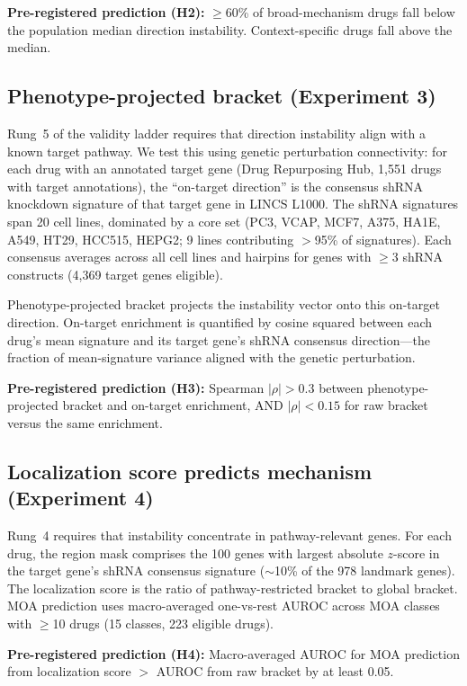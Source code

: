 \documentclass{article}
\begin{document}
\textbf{Pre-registered prediction (H2):} $\geq$60\% of broad-mechanism drugs
fall below the population median direction instability. Context-specific
drugs fall above the median.

\subsection{Phenotype-projected bracket (Experiment 3)}

Rung~5 of the validity ladder requires that direction instability align with
a known target pathway. We test this using genetic perturbation connectivity:
for each drug with an annotated target gene (Drug Repurposing Hub,
1{,}551 drugs with target annotations), the ``on-target direction'' is the
consensus shRNA knockdown signature of that target gene in LINCS L1000.
The shRNA signatures span 20 cell lines, dominated by a core set
(PC3, VCAP, MCF7, A375, HA1E, A549, HT29, HCC515, HEPG2; 9 lines
contributing $>$95\% of signatures). Each consensus averages across all
cell lines and hairpins for genes with $\geq$3 shRNA constructs
(4{,}369 target genes eligible).

Phenotype-projected bracket projects the instability vector onto this
on-target direction. On-target enrichment is quantified by cosine squared
between each drug's mean signature and its target gene's shRNA consensus
direction---the fraction of mean-signature variance aligned with the
genetic perturbation.

\textbf{Pre-registered prediction (H3):} Spearman $|\rho| > 0.3$ between
phenotype-projected bracket and on-target enrichment, AND $|\rho| < 0.15$
for raw bracket versus the same enrichment.

\subsection{Localization score predicts mechanism (Experiment 4)}

Rung~4 requires that instability concentrate in pathway-relevant genes.
For each drug, the region mask comprises the 100 genes with largest absolute
$z$-score in the target gene's shRNA consensus signature ($\sim$10\% of the
978 landmark genes). The localization score is the ratio of pathway-restricted
bracket to global bracket. MOA prediction uses macro-averaged one-vs-rest
AUROC across MOA classes with $\geq$10 drugs (15 classes, 223 eligible drugs).

\textbf{Pre-registered prediction (H4):} Macro-averaged AUROC for MOA
prediction from localization score $>$ AUROC from raw bracket by at least
0.05.
\end{document}
